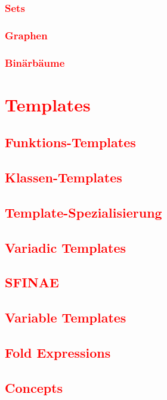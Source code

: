 \subsection{\textcolor{red}{Sets}}\label{sec:sets}
\subsection{\textcolor{red}{Graphen}}\label{sec:trees}
\subsection{\textcolor{red}{Binärbäume}}\label{sec:binary-trees}

\chapter{\textcolor{red}{Templates}}\label{chap:templates}
\section{\textcolor{red}{Funktions-Templates}}\label{sec:function-templates}
\section{\textcolor{red}{Klassen-Templates}}\label{sec:class-templates}
\section{\textcolor{red}{Template-Spezialisierung}}\label{sec:template-specialization}
\section{\textcolor{red}{Variadic Templates}}\label{sec:variadic-templates}
\section{\textcolor{red}{SFINAE}}\label{sec:sfinae}
\section{\textcolor{red}{Variable Templates}}\label{sec:variable-templates}
\section{\textcolor{red}{Fold Expressions}}\label{sec:fold-expressions}
\section{\textcolor{red}{Concepts}}\label{sec:concepts}

